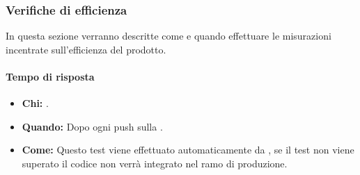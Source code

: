 \subsubsection{Verifiche di efficienza}
In questa sezione verranno descritte come e quando effettuare le misurazioni incentrate sull'efficienza del prodotto.

\paragraph{Tempo di risposta}
\begin{itemize}
\item \textbf{Chi:} .
\item \textbf{Quando:} Dopo ogni push sulla .
\item \textbf{Come:} Questo test viene effettuato automaticamente da , se il test non viene superato il codice non verrà integrato nel ramo di produzione.
\end{itemize}
